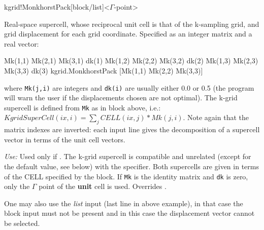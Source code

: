 \begin{fdfentry}{kgrid!MonkhorstPack}[block/list]<$\Gamma$-point>
  
  Real-space supercell, whose reciprocal unit cell is that of the
  k-sampling grid, and grid displacement for each grid coordinate.
  Specified as an integer matrix and a real vector:

  \begin{fdfexample}
        Mk(1,1)  Mk(2,1)  Mk(3,1)   dk(1)
        Mk(1,2)  Mk(2,2)  Mk(3,2)   dk(2)
        Mk(1,3)  Mk(2,3)  Mk(3,3)   dk(3)
     kgrid.MonkhorstPack [Mk(1,1) Mk(2,2) Mk(3,3)]
  \end{fdfexample}
  
  where \texttt{Mk(j,i)} are integers and \texttt{dk(i)} are usually
  either 0.0 or 0.5 (the program will warn the user if the displacements
  chosen are not optimal).
  The k-grid supercell is defined from \texttt{Mk}
  as in block  above, i.e.:
  $KgridSuperCell(ix,i) = \sum_j CELL(ix,j)*Mk(j,i)$.
  Note again that the matrix indexes are inverted: each input line
  gives the decomposition of a supercell vector in terms of the unit
  cell vectors.
  
  
  \textit{Use:} Used only if  .  The
  k-grid supercell is compatible and unrelated (except for the default
  value, see below) with the  specifier. Both
  supercells are given in terms of the CELL specified by the
   block.  If \texttt{Mk} is the identity matrix
  and \texttt{dk} is zero, only the $\Gamma$ point of the
  \textbf{unit} cell is used.  Overrides .

  One may also use the \emph{list} input (last line in above example),
  in that case the block input must not be present and in this case
  the displacement vector cannot be selected.

\end{fdfentry}

